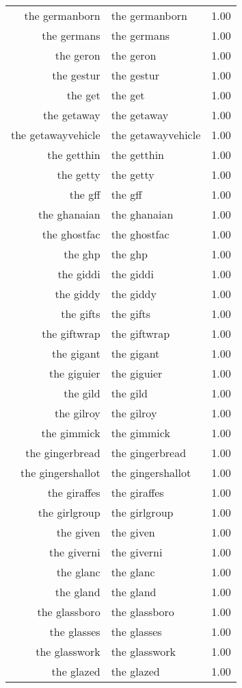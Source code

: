 \begin{table}[ht]
\begin{tabular}{rlr}
  the germanborn & the germanborn & 1.00 \\ 
  the germans & the germans & 1.00 \\ 
  the geron & the geron & 1.00 \\ 
  the gestur & the gestur & 1.00 \\ 
  the get & the get & 1.00 \\ 
  the getaway & the getaway & 1.00 \\ 
  the getawayvehicle & the getawayvehicle & 1.00 \\ 
  the getthin & the getthin & 1.00 \\ 
  the getty & the getty & 1.00 \\ 
  the gff & the gff & 1.00 \\ 
  the ghanaian & the ghanaian & 1.00 \\ 
  the ghostfac & the ghostfac & 1.00 \\ 
  the ghp & the ghp & 1.00 \\ 
  the giddi & the giddi & 1.00 \\ 
  the giddy & the giddy & 1.00 \\ 
  the gifts & the gifts & 1.00 \\ 
  the giftwrap & the giftwrap & 1.00 \\ 
  the gigant & the gigant & 1.00 \\ 
  the giguier & the giguier & 1.00 \\ 
  the gild & the gild & 1.00 \\ 
  the gilroy & the gilroy & 1.00 \\ 
  the gimmick & the gimmick & 1.00 \\ 
  the gingerbread & the gingerbread & 1.00 \\ 
  the gingershallot & the gingershallot & 1.00 \\ 
  the giraffes & the giraffes & 1.00 \\ 
  the girlgroup & the girlgroup & 1.00 \\ 
  the given & the given & 1.00 \\ 
  the giverni & the giverni & 1.00 \\ 
  the glanc & the glanc & 1.00 \\ 
  the gland & the gland & 1.00 \\ 
  the glassboro & the glassboro & 1.00 \\ 
  the glasses & the glasses & 1.00 \\ 
  the glasswork & the glasswork & 1.00 \\ 
  the glazed & the glazed & 1.00 \\ 

\end{tabular}
\end{table}
